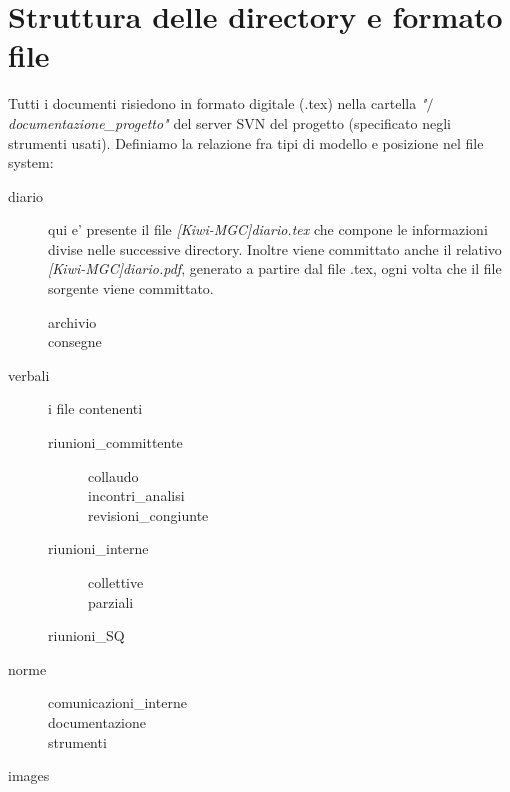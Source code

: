 \section{Struttura delle directory e formato file}
Tutti i documenti risiedono in formato digitale (.tex) nella cartella \emph{"$/$documentazione\_progetto"} del server SVN del progetto (specificato negli strumenti usati). Definiamo la relazione fra tipi di modello e posizione nel file system:
\begin{description}
\item[diario] qui e' presente il file \emph{[Kiwi-MGC]diario.tex} che compone 
le informazioni divise nelle successive directory. Inoltre viene committato
anche il relativo \emph{[Kiwi-MGC]diario.pdf}, generato a partire dal file .tex,
 ogni volta che il file sorgente viene committato.
	\begin{description}
		\item[archivio]
		\item[consegne]
	\end{description}
\item[verbali] i file contenenti
	\begin{description}
		\item[riunioni\_committente] \quad
			\begin{description}
				\item[collaudo]
				\item[incontri\_analisi]
				\item[revisioni\_congiunte]	
			\end{description}
		\item[riunioni\_interne] \quad
			\begin{description}
				\item[collettive]
				\item[parziali]
			\end{description}
		\item[riunioni\_SQ]
	\end{description}
\item[norme] \quad
	\begin{description}
		\item[comunicazioni\_interne] \quad
		\item[documentazione]
		\item[strumenti]	
	\end{description}
\item[images]
\end{description}

